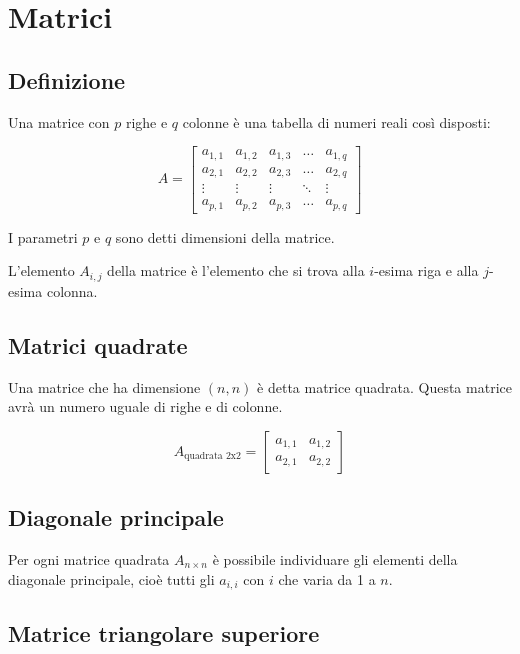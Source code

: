 \chapter{Matrici}

\section{Definizione}

Una matrice con $p$ righe e $q$ colonne è una tabella di numeri reali così disposti:

$$
A =
\begin{bmatrix}
    a_{1,1} & a_{1,2} & a_{1,3} & \dots  & a_{1,q} \\
    a_{2,1} & a_{2,2} & a_{2,3} & \dots  & a_{2,q} \\
    \vdots & \vdots & \vdots & \ddots & \vdots \\
    a_{p,1} & a_{p,2} & a_{p,3} & \dots  & a_{p,q}
\end{bmatrix}
$$

I parametri $p$ e $q$ sono detti dimensioni della matrice.

L'elemento $A_{i,j}$ della matrice è l'elemento che si trova alla $i$-esima riga e alla $j$-esima colonna.

\section{Matrici quadrate}

Una matrice che ha dimensione $(n,n)$ è detta matrice quadrata. Questa matrice avrà un numero uguale di righe e di colonne.

$$
A_{\text{quadrata 2x2}} =
\begin{bmatrix}
    a_{1,1} & a_{1,2} \\
    a_{2,1} & a_{2,2}
\end{bmatrix}
$$

\section{Diagonale principale}

Per ogni matrice quadrata $A_{n \times n}$ è possibile individuare gli elementi della diagonale principale, cioè tutti gli $a_{i,i}$ con $i$ che varia da 1 a $n$.

\section{Matrice triangolare superiore}

